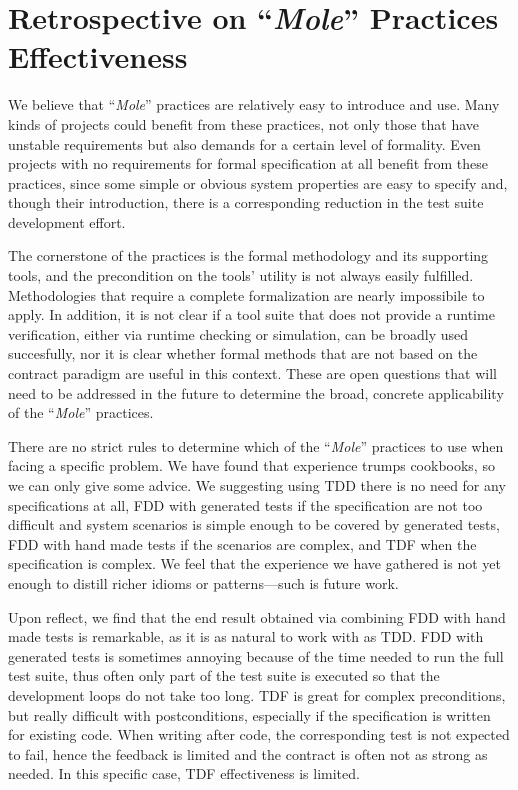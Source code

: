\documentclass[english]{lni}
\newcommand{\mole}{``\emph{Mole}''\xspace}
\begin{document}
\section{Retrospective on \mole Practices Effectiveness}
\label{subsec:test_cases_retrospectives}

We believe that \mole practices are relatively easy to introduce and
use.  Many kinds of projects could benefit from these practices, not
only those that have unstable requirements but also demands for a
certain level of formality.  Even projects with no requirements for
formal specification at all benefit from these practices, since some
simple or obvious system properties are easy to specify and, though
their introduction, there is a corresponding reduction in the test
suite development effort.

The cornerstone of the practices is the formal methodology and its
supporting tools, and the precondition on the tools' utility is not
always easily fulfilled.  Methodologies that require a complete
formalization are nearly impossibile to apply.  In addition, it is not
clear if a tool suite that does not provide a runtime verification,
either via runtime checking or simulation, can be broadly used
succesfully, nor it is clear whether formal methods that are not based
on the contract paradigm are useful in this context.  These are open
questions that will need to be addressed in the future to determine
the broad, concrete applicability of the \mole practices.

There are no strict rules to determine which of the \mole practices to
use when facing a specific problem.  We have found that experience
trumps cookbooks, so we can only give some advice.  We suggesting
using TDD there is no need for any specifications at all, FDD with
generated tests if the specification are not too difficult and system
scenarios is simple enough to be covered by generated tests, FDD with
hand made tests if the scenarios are complex, and TDF when the
specification is complex.  We feel that the experience we have
gathered is not yet enough to distill richer idioms or patterns---such
is future work.

Upon reflect, we find that the end result obtained via combining FDD
with hand made tests is remarkable, as it is as natural to work with
as TDD.  FDD with generated tests is sometimes annoying because of the
time needed to run the full test suite, thus often only part of the
test suite is executed so that the development loops do not take too
long.  TDF is great for complex preconditions, but really difficult
with postconditions, especially if the specification is written for
existing code.  When writing after code, the corresponding test is not
expected to fail, hence the feedback is limited and the contract is
often not as strong as needed.  In this specific case, TDF
effectiveness is limited.
\end{document}
